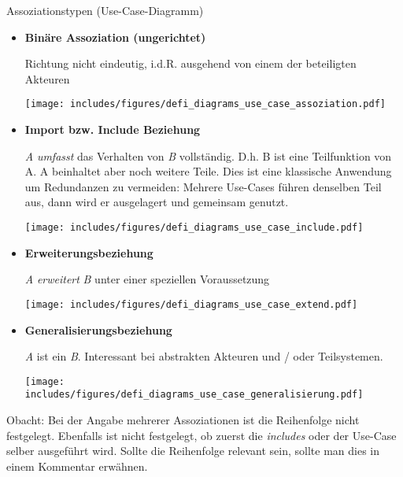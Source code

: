 \begin{diag}{Assoziationstypen (Use-Case-Diagramm)}
    \begin{itemize}
        \item \textbf{Binäre Assoziation (ungerichtet)}

              Richtung nicht eindeutig, i.d.R. ausgehend von einem der beteiligten Akteuren

              \vspace{1em}
              \begin{center}
                  \texttt{[image: includes/figures/defi\_diagrams\_use\_case\_assoziation.pdf]}
              \end{center}

        \item \textbf{Import bzw. Include Beziehung}

              \emph{A} \emph{umfasst} das Verhalten von \emph{B} vollständig.
              D.h. B ist eine Teilfunktion von A.
              A beinhaltet aber noch weitere Teile.
              Dies ist eine klassische Anwendung um Redundanzen zu vermeiden:
              Mehrere Use-Cases führen denselben Teil aus, dann wird er ausgelagert und gemeinsam genutzt.

              \vspace{1em}
              \begin{center}
                  \texttt{[image: includes/figures/defi\_diagrams\_use\_case\_include.pdf]}
              \end{center}

        \item \textbf{Erweiterungsbeziehung}

              \emph{A} \emph{erweitert} \emph{B} unter einer speziellen Voraussetzung

              \vspace{1em}
              \begin{center}
                  \texttt{[image: includes/figures/defi\_diagrams\_use\_case\_extend.pdf]}
              \end{center}

        \item \textbf{Generalisierungsbeziehung}

              \emph{A} ist ein \emph{B}.
              Interessant bei abstrakten Akteuren und / oder Teilsystemen.

              \vspace{1em}
              \begin{center}
                  \texttt{[image: includes/figures/defi\_diagrams\_use\_case\_generalisierung.pdf]}
              \end{center}
    \end{itemize}

    Obacht: Bei der Angabe mehrerer Assoziationen ist die Reihenfolge nicht festgelegt.
    Ebenfalls ist nicht festgelegt, ob zuerst die \emph{includes} oder der Use-Case selber ausgeführt wird.
    Sollte die Reihenfolge relevant sein, sollte man dies in einem Kommentar erwähnen.
\end{diag}

